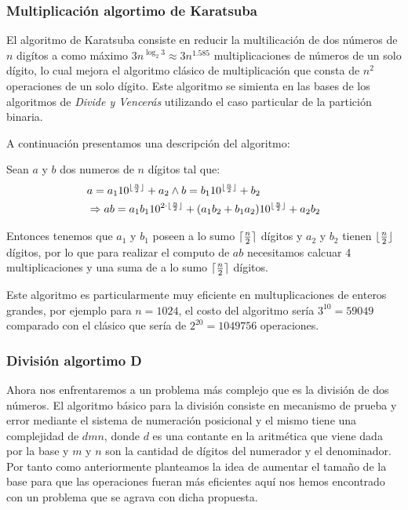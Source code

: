 \documentclass[a4paper,10pt,twocolumn]{article}
\begin{document}
\subsubsection{Multiplicación algortimo de Karatsuba}\label{sub:multiplication}
	El algoritmo de Karatsuba consiste en reducir la multilicación de dos números de $n$ digítos a como máximo 
	$3n^{\log_2 3}\approx 3n^{1.585}$ multiplicaciones de números de un solo dígito, lo cual mejora el algoritmo clásico de multiplicación que consta de $n^2$ operaciones de un solo dígito. Este algoritmo se simienta en las bases de los algoritmos de \emph{Divide y Vencerás} utilizando el caso particular de la partición binaria.
	
	A continuación presentamos una descripción del algoritmo:
	
	Sean $a$ y $b$ dos numeros de $n$ dígitos tal que:
		\begin{equation}
			\begin{split}
				&a=a_1 10^{\lfloor {n\over 2}\rfloor} + a_2 \wedge b=b_1 10^{\lfloor {n\over 2}\rfloor} + b_2	\\	
				&\Rightarrow ab=a_1 b_1 10^{2\cdot\lfloor {n\over 2}\rfloor}+(a_1 b_2+b_1 a_2 )10^{\lfloor {n\over 2}\rfloor}+a_2 b_2
			\end{split}
		\end{equation}			
			
	 Entonces tenemos que $a_1$ y $b_1$ poseen a lo sumo $\lceil {n\over 2}\rceil$ dígitos y $a_2$ y $b_2$ tienen $\lfloor {n\over 2}\rfloor$ dígitos, por lo que para realizar el computo de $ab$ necesitamos calcuar 4 multiplicaciones y una suma de a lo sumo $\lceil {n\over 2}\rceil$ dígitos.
	 
	 Este algoritmo es particularmente muy eficiente en multuplicaciones de enteros grandes, por ejemplo para $n=1024$, el costo del algoritmo sería $3^{10}=59049$ comparado con el clásico que sería de $2^{20}=1049756$ operaciones. 
	
	
\subsubsection{División algortimo D}\label{sub:division}
	Ahora nos enfrentaremos a un problema más complejo que es la división de dos números. El algoritmo básico para la división consiste en mecanismo de prueba y error mediante el sistema de numeración posicional y el mismo tiene una complejidad de $d m n$, donde $d$ es una contante en la aritmética que viene dada por la base y $m$ y $n$ son la cantidad de dígitos del numerador y el denominador. Por tanto como anteriormente planteamos la idea de aumentar el tamaño de la base para que las operaciones fueran más eficientes aquí nos hemos encontrado con un problema que se agrava con dicha propuesta.
	
\end{document}
